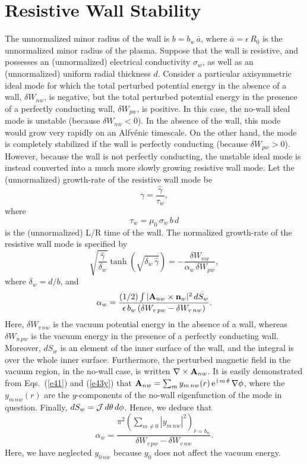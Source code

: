 \documentclass[12pt,prb,aps]{revtex4-1}
\begin{document}
\section{Resistive Wall Stability}
The unnormalized minor radius of the wall is $b=b_w\,\bar{a}$, where $\bar{a}=\epsilon\,R_0$  is the unnormalized minor radius of the plasma. Suppose that the wall is resistive, and possesses an (unnormalized)  electrical conductivity $\sigma_w$, as well as an (unnormalized)  uniform radial thickness $d$. 
Consider a particular axisymmetric ideal mode for which the total perturbed potential energy in the absence of a wall, 
 $\delta W_{nw}$, is negative,  but the total perturbed potential energy in the presence of a perfectly conducting wall, $\delta W_{pw}$, is positive.  In this case,  the no-wall ideal mode is unstable (because $\delta W_{nw}<0$). In the absence of  the wall, this mode would grow very rapidly on an Alfv\'{e}nic timescale. On the other
 hand, the mode is completely stabilized if the wall is perfectly conducting (because $\delta W_{pw}>0$).  However, because the wall is not perfectly conducting, the unstable ideal mode is
 instead converted into a much more slowly growing resistive wall mode. 
 Let the (unnormalized) 
 growth-rate of the resistive wall mode be
 \begin{equation}
 \gamma= \frac{\hat{\gamma}}{\tau_w},
 \end{equation}
 where
 \begin{equation}
 \tau_w = \mu_0\,\sigma_w\,b\,d
 \end{equation}
 is the (unnormalized) L/R time of the wall. 
 The normalized growth-rate of the resistive wall mode is specified by\,\cite{rwm4,rwm5}
 \begin{equation}
 \sqrt{\frac{\hat{\gamma}}{\delta_w}}\tanh\left(\sqrt{\delta_w\,\hat{\gamma}}\right) = -\frac{\delta W_{nw}}{\alpha_w\,\delta W_{pw}},
 \end{equation}
 where $\delta_w=d/b$, 
and
 \begin{equation}
 \alpha_w = \frac{(1/2)\int|{\bf A}_{nw}\times {\bf n}_w|^2\,dS_w}{\epsilon\,b_w\,(\delta W_{v\,pw}- \delta W_{v\,nw})}.
 \end{equation}
 Here, $\delta W_{v\,nw}$ is the vacuum potential energy in the absence of a wall, whereas $\delta W_{n\,pw}$ is the vacuum energy in the presence of a
 perfectly conducting wall. 
 Moreover, $dS_w$ is an element of the inner  surface of the wall, and the integral is over the whole inner surface. Furthermore,
 the perturbed magnetic field in the vacuum region, in the no-wall case, is written $\nabla\times {\bf A}_{nw}$. 
 It is easily demonstrated from Eqs.~(\ref{e41}) and (\ref{e43y}) that ${\bf A}_{nw}= \sum_{m} y_{m\,nw}(r)\,{\rm e}^{\,{\rm i}\,m\,\theta}\,\nabla\phi$,
 where the $y_{m\,nw}(r)$ are the $y$-components of the no-wall eigenfunction of the mode in question. Finally, $dS_w= {\cal J}\,d\theta\,d\phi$. 
 Hence, we deduce that
 \begin{equation}
 \alpha_w = \frac{\pi^2\left(\sum_{m\neq 0} |y_{m\,nw}|^2\right)_{\hat{r}=b_w}}{\delta W_{v\,pw}- \delta W_{v\,nw}}.
 \end{equation}
 Here, we have neglected $y_{0\,nw}$ because $y_0$ does not affect the vacuum energy. 
 
\end{document}

